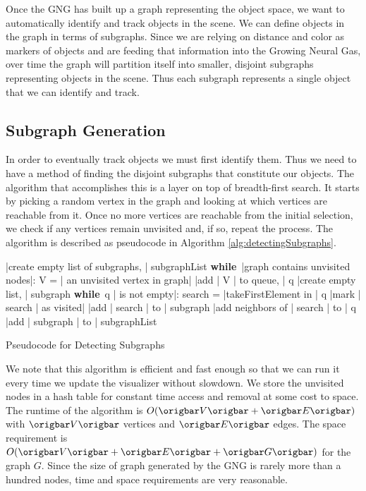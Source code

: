 \documentclass{article}
\renewcommand{\|}{\origbar} %
\renewcommand{\WHILE}{\mbox{{\bf while} }\tab}
\begin{document}
Once the GNG has built up a graph representing the object space, we want to automatically identify and track objects in the scene. We can define objects in the graph in terms of subgraphs. Since we are relying on distance and color as markers of objects and are feeding that information into the Growing Neural Gas, over time the graph will partition itself into smaller, disjoint subgraphs representing objects in the scene. Thus each subgraph represents a single object that we can identify and track.

\subsection{Subgraph Generation}

In order to eventually track objects we must first identify them. Thus we need to have a method of finding the disjoint subgraphs that constitute our objects. The algorithm that accomplishes this is a layer on top of breadth-first search. It starts by picking a random vertex in the graph and looking at which vertices are reachable from it. Once no more vertices are reachable from the initial selection, we check if any vertices remain unvisited and, if so, repeat the process. The algorithm is described as pseudocode in Algorithm \ref{alg:detectingSubgraphs}.

\begin{Algorithm}[h!]
\begin{program}
  |create empty list of subgraphs, | subgraphList 
  \WHILE |graph contains unvisited nodes|:
    V = | an unvisited vertex in graph|
    |add | V | to queue, | q
    |create empty list, | subgraph 
    \WHILE q | is not empty|:
      search = |takeFirstElement in | q 
      |mark | search | as visited|
      |add | search | to | subgraph
      |add neighbors of | search | to | q \untab
  |add | subgraph | to | subgraphList
\end{program}
\caption{Pseudocode for Detecting Subgraphs}
\label{alg:detectingSubgraphs}
\end{Algorithm}

We note that this algorithm is efficient and fast enough so that we can run it every time we update the visualizer without slowdown. We store the unvisited nodes in a hash table for constant time access and removal at some cost to space. The runtime of the algorithm is $O(\|V\|+\|E\|)$ with $\|V\|$ vertices and $\|E\|$ edges. The space requirement is $O(\|V\|+\|E\|+\|G\|)$ for the graph $G$. Since the size of graph generated by the GNG is rarely more than a hundred nodes, time and space requirements are very reasonable.
\end{document}
